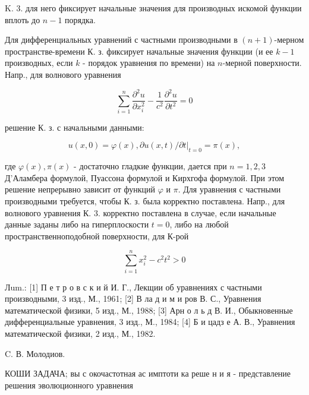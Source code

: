 \documentclass[10pt]{article}
\begin{document}
K. 3. для него фиксирует начальные значения для производных искомой функции вплоть до $n-1$ порядка.



Для дифференциальных уравнений с частными производными в $(n+1)$-мерном пространстве-времени К. з. фиксирует начальные значения функции (и ее $k-1$ производных, если $k$ - порядок уравнения по времени) на $n$-мерной поверхности. Напр., для волнового уравнения



\[

\sum_{i=1}^{n} \frac{\partial^{2} u}{\partial x_{i}^{2}}-\frac{1}{c^{2}} \frac{\partial^{2} u}{\partial t^{2}}=0

\]



решение К. з. с начальными данными:



\[

u(x, 0)=\varphi(x), \partial u(x, t) /\left.\partial t\right|_{t=0}=\pi(x),

\]



где $\varphi(x), \pi(x)$ - достаточно гладкие функции, дается при $n=1,2,3$ Д'Аламбера формулой, Пуассона формулой и Кирхгофа формулой. При этом решение непрерывно зависит от функций $\varphi$ и $\pi$. Для уравнения с частными производными требуется, чтобы К. з. была корректно поставлена. Напр., для волнового уравнения К. 3. корректно поставлена в случае, если начальные данные заданы либо на гиперплоскости $t=0$, либо на любой пространственноподобной поверхности, для К-рой



\[

\sum_{i=1}^{n} x_{i}^{2}-c^{2} t^{2}>0

\]



Лum.: [1] П е т р о в с к и й И. Г., Лекщии об уравнениях с частными производными, 3 изд., М., 1961; [2] В ла д и м и ров В. С., Уравнения математической физики, 5 изд., М., 1988; [3] Арн о л ь д В. И., Обыкновенные дифференциальные уравнения, 3 изд., М., 1984; [4] Б и цадз е А. В., Уравнения математической физики, 2 изд., М., 1982.



C. В. Молодиов.



КОШИ ЗАДАЧА; вы с окочастотная ас имптоти ка реше н и я - представление решения эволюционного уравнения
\end{document}

